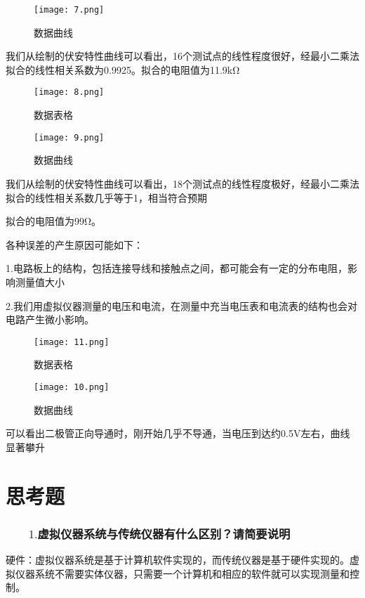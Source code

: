 \documentclass[12pt,a4paper]{article}
\begin{document}
\begin{figure}[H]
    \centering
    \caption{数据曲线}
    \texttt{[image: 7.png]}
\end{figure}
我们从绘制的伏安特性曲线可以看出，16个测试点的线性程度很好，经最小二乘法拟合的线性相关系数为0.9925。拟合的电阻值为11.9kΩ


\begin{figure}[H]
    \centering
    \caption{数据表格}
    \texttt{[image: 8.png]}
\end{figure}

\begin{figure}[H]
\centering
\caption{数据曲线}
\texttt{[image: 9.png]}
\end{figure}



我们从绘制的伏安特性曲线可以看出，18个测试点的线性程度极好，经最小二乘法拟合的线性相关系数几乎等于1，相当符合预期\par
拟合的电阻值为99Ω。\par

各种误差的产生原因可能如下：\par
1.电路板上的结构，包括连接导线和接触点之间，都可能会有一定的分布电阻，影响测量值大小\par
2.我们用虚拟仪器测量的电压和电流，在测量中充当电压表和电流表的结构也会对电路产生微小影响。


\begin{figure}[H]
    \centering
    \caption{数据表格}
    \texttt{[image: 11.png]}
\end{figure}

\begin{figure}[H]
\centering
\caption{数据曲线}
\texttt{[image: 10.png]}
\end{figure}


可以看出二极管正向导通时，刚开始几乎不导通，当电压到达约0.5V左右，曲线显著攀升

\section{思考题}
    \subsubsection*{$\qquad1.$虚拟仪器系统与传统仪器有什么区别？请简要说明}
    硬件：虚拟仪器系统是基于计算机软件实现的，而传统仪器是基于硬件实现的。虚拟仪器系统不需要实体仪器，只需要一个计算机和相应的软件就可以实现测量和控制。
\end{document}
